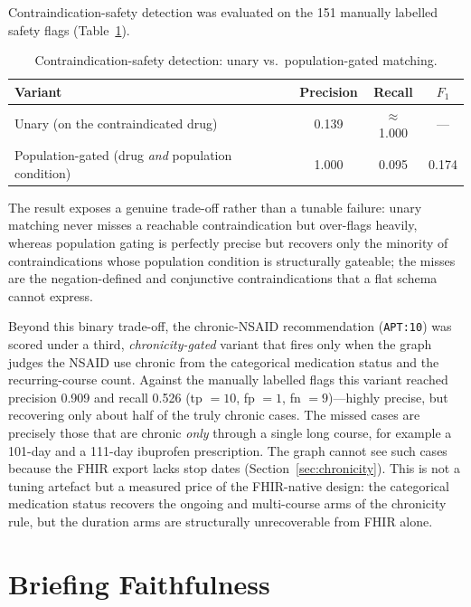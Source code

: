 Contraindication-safety detection was evaluated on the 151 manually labelled
safety flags (Table~\ref{tab:safety}).

\begin{table}[h]
\centering
\caption{Contraindication-safety detection: unary vs.\ population-gated matching.}
\label{tab:safety}
\begin{tabular}{lccc}
\hline
\textbf{Variant} & \textbf{Precision} & \textbf{Recall} & \textbf{$F_1$} \\
\hline
Unary (on the contraindicated drug) & 0.139 & $\approx$1.000 & --- \\
Population-gated (drug \emph{and} population condition) & 1.000 & 0.095 & 0.174 \\
\hline
\end{tabular}
\end{table}

The result exposes a genuine trade-off rather than a tunable failure: unary matching never
misses a reachable contraindication but over-flags heavily, whereas population gating is
perfectly precise but recovers only the minority of contraindications whose population
condition is structurally gateable; the misses are the negation-defined and conjunctive
contraindications that a flat schema cannot express.

Beyond this binary trade-off, the chronic-NSAID recommendation (\texttt{APT:10}) was scored
under a third, \emph{chronicity-gated} variant that fires only when the graph judges the
NSAID use chronic from the categorical medication status and the recurring-course count.
Against the manually labelled flags this variant reached precision 0.909 and
recall 0.526 (tp $=10$, fp $=1$, fn $=9$)---highly precise, but
recovering only about half of the truly chronic cases. The missed cases are precisely those that are chronic \emph{only} through a single long
course, for example a 101-day and a 111-day ibuprofen prescription. The graph cannot see
such cases because the FHIR export lacks stop dates (Section~\ref{sec:chronicity}). This is
not a tuning artefact but a measured price of the FHIR-native design: the categorical
medication status recovers the ongoing and multi-course arms of the chronicity rule, but the
duration arms are structurally unrecoverable from FHIR alone.

\section{Briefing Faithfulness}
\label{sec:faithfulness}

